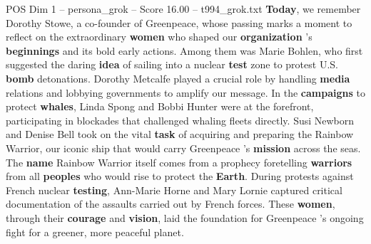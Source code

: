 \begin{textsample}{POS Dim 1 – persona\_grok – Score 16.00 – t994\_grok.txt}  \label{ex:f1_pos_038}
\textbf{Today}, we remember Dorothy Stowe, a co-founder of Greenpeace, whose passing marks a moment to reflect on the extraordinary \textbf{women} who shaped our \textbf{organization} 's \textbf{beginnings} and its bold early actions.
Among them was Marie Bohlen, who first suggested the daring \textbf{idea} of sailing into a nuclear \textbf{test} zone to protest U.S. \textbf{bomb} detonations.
Dorothy Metcalfe played a crucial role by handling \textbf{media} relations and lobbying governments to amplify our message.
In the \textbf{campaigns} to protect \textbf{whales}, Linda Spong and Bobbi Hunter were at the forefront, participating in blockades that challenged whaling fleets directly.
Susi Newborn and Denise Bell took on the vital \textbf{task} of acquiring and preparing the Rainbow Warrior, our iconic ship that would carry Greenpeace 's \textbf{mission} across the seas.
The \textbf{name} Rainbow Warrior itself comes from a prophecy foretelling \textbf{warriors} from all \textbf{peoples} who would rise to protect the \textbf{Earth}.
During protests against French nuclear \textbf{testing}, Ann-Marie Horne and Mary Lornie captured critical documentation of the assaults carried out by French forces.
These \textbf{women}, through their \textbf{courage} and \textbf{vision}, laid the foundation for Greenpeace 's ongoing fight for a greener, more peaceful planet.

\end{textsample}
